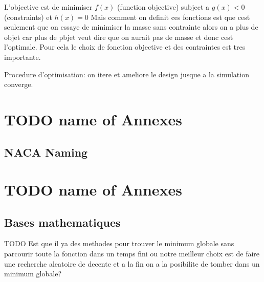 \documentclass[12pt, a4paper]{book}%
\theoremstyle{definition}
\theoremstyle{remark}
\begin{document}
L'objective est de minimiser $f(x)$ (function objective) subject a $g(x)<0$ (constraints) et  $h(x)=0$ 
Mais comment on definit ces fonctions est que cest seulement que on essaye de minimiser la masse sans contrainte alors on a plus de objet car plus de pbjet veut dire que on aurait pas de masse et donc cest l'optimale. Pour cela le choix de fonction objective et des contraintes est tres importante. 

Procedure d'optimisation: on itere et ameliore le design jusque a la simulation converge. 





\newpage
\thispagestyle{empty}
\nocite{*}
\printbibliography[title = Bibliographie] %



\newpage
\appendix
\renewcommand{\thefigure}{A\arabic{figure}}
\setcounter{figure}{0}

\chapter{TODO name of Annexes}
\section{NACA Naming}

\chapter{TODO name of Annexes}
\section{Bases mathematiques}



% 
TODO Est que il ya  des methodes pour trouver le minimum globale sans parcourir toute la fonction dans un temps fini ou notre meilleur choix est de faire une recherche aleatoire de decente et a la fin on a la posibilite de tomber dans un minimum globale?
\end{document}
